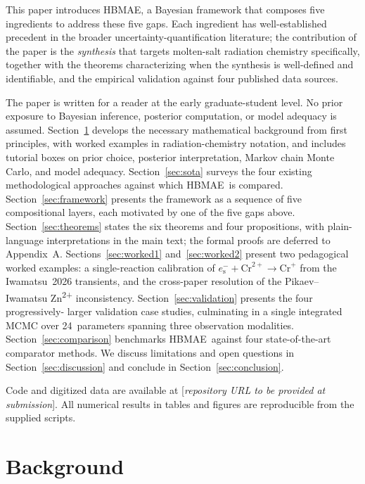 \documentclass[12pt]{article}
\theoremstyle{plain}
\theoremstyle{definition}
\theoremstyle{remark}
\newcommand{\eS}{\ensuremath{e_{\mathrm{s}}^{-}}\xspace}
\newcommand{\HBMAE}{HBMAE\xspace}
\begin{document}
This paper introduces \HBMAE, a Bayesian framework that composes five
ingredients to address these five gaps.  Each ingredient has well-established
precedent in the broader uncertainty-quantification literature; the
contribution of the paper is the \emph{synthesis} that targets molten-salt
radiation chemistry specifically, together with the theorems characterizing
when the synthesis is well-defined and identifiable, and the empirical
validation against four published data sources.

The paper is written for a reader at the early graduate-student level.  No
prior exposure to Bayesian inference, posterior computation, or model adequacy
is assumed.  Section~\ref{sec:background} develops the necessary mathematical
background from first principles, with worked examples in radiation-chemistry
notation, and includes tutorial boxes on prior choice, posterior interpretation,
Markov chain Monte Carlo, and model adequacy.  Section~\ref{sec:sota} surveys
the four existing methodological approaches against which \HBMAE\ is
compared.  Section~\ref{sec:framework} presents the framework as a sequence of
five compositional layers, each motivated by one of the five gaps above.
Section~\ref{sec:theorems} states the six theorems and four propositions, with
plain-language interpretations in the main text; the formal proofs are
deferred to Appendix~A.  Sections~\ref{sec:worked1} and~\ref{sec:worked2}
present two pedagogical worked examples:  a single-reaction calibration of
$\eS+\mathrm{Cr}^{2+}\to\mathrm{Cr}^+$ from the Iwamatsu~2026 transients, and
the cross-paper resolution of the Pikaev--Iwamatsu \mbox{Zn}\textsuperscript{2+}
inconsistency.  Section~\ref{sec:validation} presents the four progressively-
larger validation case studies, culminating in a single integrated MCMC over
24~parameters spanning three observation modalities.  Section~\ref{sec:comparison}
benchmarks \HBMAE\ against four state-of-the-art comparator methods.  We
discuss limitations and open questions in Section~\ref{sec:discussion} and
conclude in Section~\ref{sec:conclusion}.

Code and digitized data are available at
[\textit{repository URL to be provided at submission}].  All numerical results
in tables and figures are reproducible from the supplied scripts.

\bigskip

\section{Background}\label{sec:background}
\end{document}
